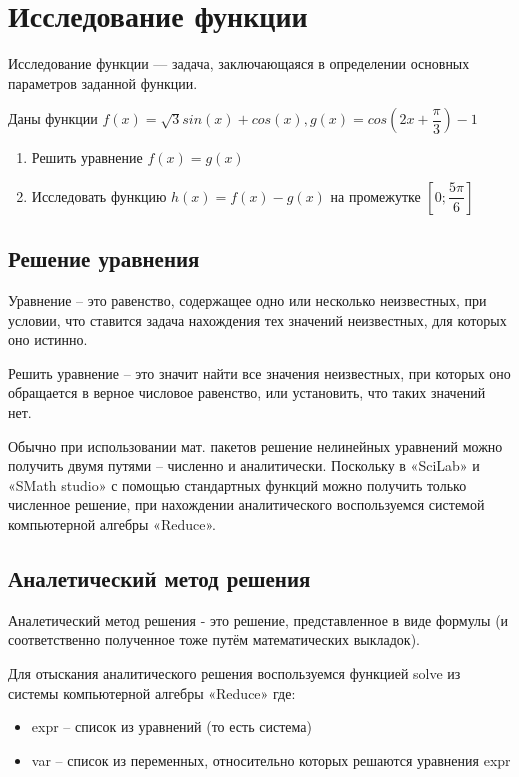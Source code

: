 \documentclass[russian,utf8,nocolumnxxxi,nocolumnxxxii]{eskdtext}
\begin{document}

\newpage

\section{Исследование функции}

Исследование функции — задача, заключающаяся в определении основных параметров заданной функции.

Даны функции $f(x)=\sqrt{3}sin(x)+cos(x),g(x)=cos(2x+\dfrac{\pi}{3})-1$
\begin{enumerate}
\item Решить уравнение $f(x)=g(x)$
\item Исследовать функцию $h(x)=f(x)-g(x)$ на промежутке $[0;\dfrac{5\pi}{6}]$
\end{enumerate}

\subsection{Решение уравнения}

Уравнение – это равенство, содержащее одно или несколько неизвестных, при условии, что ставится задача нахождения тех значений неизвестных, для которых оно истинно.

Решить уравнение – это значит найти все значения неизвестных, при которых оно обращается в верное числовое равенство, или установить, что таких значений нет.

Обычно при использовании мат. пакетов решение нелинейных уравнений можно получить двумя путями – численно и аналитически. Поскольку в «SciLab» и «SMath studio»  с помощью стандартных функций можно получить только численное решение, при нахождении аналитического воспользуемся системой компьютерной алгебры «Reduce».

\subsection{Аналетический метод решения}

Аналетический метод решения - это решение, представленное в виде формулы (и соответственно полученное тоже путём математических выкладок).

Для отыскания аналитического решения воспользуемся функцией solve из системы компьютерной алгебры «Reduce» где:
\begin{itemize}
 \item expr – список из уравнений (то есть система)
 \item var – список из переменных, относительно которых решаются уравнения expr
\end{itemize}
\end{document}
